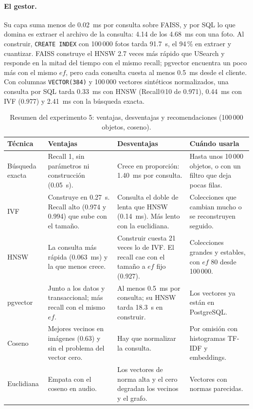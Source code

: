 \paragraph{El gestor.} Su capa suma menos de 0.02~ms por consulta sobre FAISS, y por SQL lo
que domina es extraer el archivo de la consulta: 4.14 de los 4.68~ms con una foto. Al
construir, \texttt{CREATE INDEX} con 100\,000 fotos tarda 91.7~s, el 94\,\% en extraer y
cuantizar. FAISS construye el HNSW 2.7 veces más rápido que USearch y responde en la mitad
del tiempo con el mismo recall; pgvector encuentra un poco más con el mismo $ef$, pero cada
consulta cuesta al menos 0.5~ms desde el cliente. Con columnas \texttt{VECTOR(384)} y
100\,000 vectores sintéticos normalizados, una consulta por SQL tarda 0.33~ms con HNSW
(Recall@10 de 0.971), 0.44~ms con IVF (0.977) y 2.41~ms con la búsqueda exacta.

\begin{table}[!htb]
\centering
\caption{Resumen del experimento 5: ventajas, desventajas y recomendaciones (100\,000
objetos, coseno).}\label{tab:resumen-multimedia}
\small
\begin{tabular}{@{}L{2.4cm}L{4.6cm}L{4.6cm}L{4.2cm}@{}}
\toprule
\textbf{Técnica} & \textbf{Ventajas} & \textbf{Desventajas} & \textbf{Cuándo usarla} \\
\midrule
Búsqueda exacta & Recall 1, sin parámetros ni construcción (0.05~s). & Crece en proporción: 1.40~ms por consulta. & Hasta unos 10\,000 objetos, o con un filtro que deja pocas filas. \\
IVF & Construye en 0.27~s. Recall alto (0.974 y 0.994) que sube con el tamaño. & Consulta el doble de lenta que HNSW (0.14~ms). Más lento con la euclidiana. & Colecciones que cambian mucho o se reconstruyen seguido. \\
HNSW & La consulta más rápida (0.063~ms) y la que menos crece. & Construir cuesta 21 veces lo de IVF. El recall cae con el tamaño a $ef$ fijo (0.927). & Colecciones grandes y estables, con $ef$ 80 desde 100\,000. \\
pgvector & Junto a los datos y transaccional; más recall con el mismo $ef$. & Al menos 0.5~ms por consulta; su HNSW tarda 18.3~s en construir. & Los vectores ya están en PostgreSQL. \\
Coseno & Mejores vecinos en imágenes (0.63) y sin el problema del vector cero. & Hay que normalizar la consulta. & Por omisión con histogramas TF-IDF y embeddings. \\
Euclidiana & Empata con el coseno en audio. & Los vectores de norma alta y el cero degradan los vecinos y el grafo. & Vectores con normas parecidas. \\
\bottomrule
\end{tabular}
\end{table}

